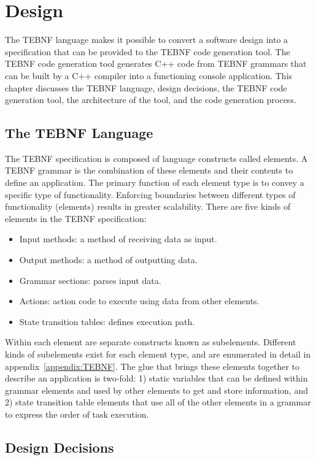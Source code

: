 \chapter{Design}
The TEBNF language makes it possible to convert a software design into a specification that can be provided to the TEBNF code generation tool.  The TEBNF code generation tool generates C++ code from TEBNF grammars that can be built by a C++ compiler into a functioning console application.  This chapter discusses the TEBNF language, design decisions, the TEBNF code generation tool, the architecture of the tool, and the code generation process.

\section{The TEBNF Language}
The TEBNF specification is composed of language constructs called elements.  A TEBNF grammar is the combination of these elements and their contents to define an application.   The primary function of each element type is to convey a specific type of functionality.  Enforcing boundaries between different types of functionality (elements) results in greater scalability.  There are five kinds of elements in the TEBNF specification:
\begin{itemize}
  \item Input methods: a method of receiving data as input.
  \item Output methods: a method of outputting data.
  \item Grammar sections: parses input data. 
  \item Actions: action code to execute using data from other elements.
  \item State transition tables: defines execution path.
\end{itemize}

\indent
Within each element are separate constructs known as subelements.  Different kinds of subelements exist for each element type, and are enumerated in detail in appendix~\ref{appendix:TEBNF}.  The glue that brings these elements together to describe an application is two-fold: 1) static variables that can be defined within grammar elements and used by other elements to get and store information, and 2) state transition table elements that use all of the other elements in a grammar to express the order of task execution.

\section{Design Decisions}

